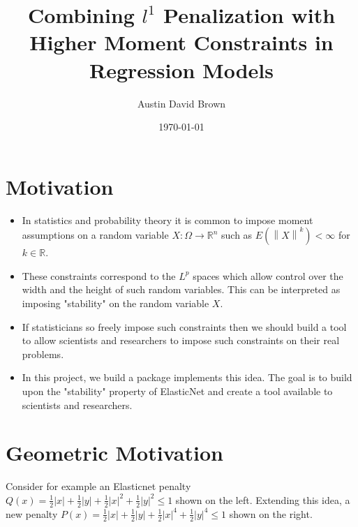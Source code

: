\documentclass[10pt, reqno]{article}
\numberwithin{equation}{section}
\newcommand{\norm}[1]{\left\lVert#1\right\rVert}
\newcommand{\R}{\mathbb{R}}
\begin{document}
\setlength{\footskip}{-1cm}
 

\title{Combining $l^1$ Penalization with Higher Moment Constraints in Regression Models}
\author{Austin David Brown}
\date{\today}

\maketitle

\newpage
\section*{Motivation}

\begin{itemize}
\item In statistics and probability theory it is common to impose moment assumptions on a random variable $X : \Omega \to \R^n$ such as $E(\norm{X}^k) < \infty$ for $k \in \R$.

\item These constraints correspond to the $L^p$ spaces which allow control over the width and the height of such random variables.
This can be interpreted as imposing "stability" on the random variable $X$.

\item If statisticians so freely impose such constraints then we should build a tool to allow scientists and researchers to impose such constraints on their real problems.

\item  In this project, we build a package implements this idea.
The goal is to build upon the "stability" property of ElasticNet \cite{elasticnet} and create a tool available to scientists and researchers.

\end{itemize}

\newpage
\section*{Geometric Motivation}
Consider for example an Elasticnet \cite{elasticnet} penalty $Q(x) = \frac{1}{2} |x| + \frac{1}{2} |y| + \frac{1}{2} |x|^2 + \frac{1}{2} |y|^2 \le 1$
shown on the left. Extending this idea, a new penalty $P(x) = \frac{1}{2} |x| + \frac{1}{2} |y| + \frac{1}{2} |x|^4 + \frac{1}{2} |y|^4 \le 1$ shown on the right.
\end{document}

